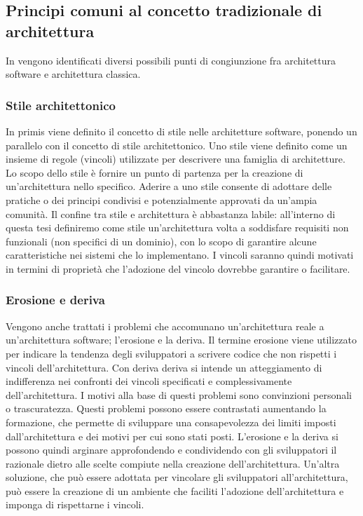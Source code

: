 \documentclass[a4paper,12pt]{report}
\begin{document}
\subsection{Principi comuni al concetto tradizionale di architettura}
In \cite{perry_foundations_1992} vengono identificati diversi possibili punti di congiunzione fra architettura software e architettura classica.
\subsubsection{Stile architettonico}\label{stile architettonico}
In primis viene definito il concetto di stile nelle architetture software, ponendo un parallelo con il concetto di stile architettonico. 
Uno stile viene definito come un insieme di regole (vincoli) utilizzate per descrivere una famiglia di architetture. 
Lo scopo dello stile è fornire un punto di partenza per la creazione di un'architettura nello specifico.
Aderire a uno stile consente di adottare delle pratiche o dei principi condivisi e potenzialmente approvati da un'ampia comunità. 
Il confine tra stile e architettura è abbastanza labile: all'interno di questa tesi definiremo come stile un'architettura volta a soddisfare requisiti non funzionali (non specifici di un dominio), con lo scopo di garantire alcune caratteristiche nei sistemi che lo implementano. 
I vincoli saranno quindi motivati in termini di proprietà che l'adozione del vincolo dovrebbe garantire o facilitare.
\subsubsection{Erosione e deriva}\label{erosione e deriva}

Vengono anche trattati i problemi che accomunano un'architettura reale a un'architettura software; l'erosione e la deriva.
Il termine erosione viene utilizzato per indicare la tendenza degli sviluppatori a scrivere codice che non rispetti i vincoli dell'architettura.
Con deriva deriva si intende un atteggiamento di indifferenza nei confronti dei vincoli specificati e complessivamente dell'architettura.
I motivi alla base di questi problemi sono convinzioni personali o trascuratezza.
Questi problemi possono essere contrastati aumentando la formazione, che permette di sviluppare una consapevolezza dei limiti imposti dall'architettura e dei motivi per cui sono stati posti.
L'erosione e la deriva si possono quindi arginare approfondendo e condividendo con gli sviluppatori il razionale dietro alle scelte compiute nella creazione dell'architettura.
Un'altra soluzione, che può essere adottata per vincolare gli sviluppatori all'architettura, può essere la creazione di un ambiente che faciliti l'adozione dell'architettura e imponga di rispettarne i vincoli.
\end{document}
